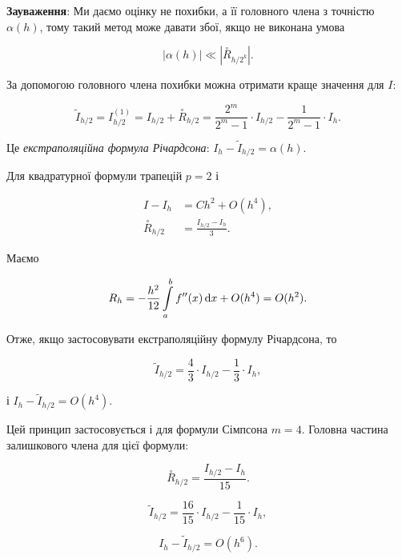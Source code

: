 \textbf{Зауваження}: Ми даємо оцінку не похибки, а її головного члена з точністю $\alpha(h)$, тому такий метод може давати збої, якщо не виконана умова

\begin{equation}
	|\alpha(h)| \ll \left| \overset{\circ} R_{h/2^k} \right|.
\end{equation}

За допомогою головного члена похибки можна отримати краще значення для $I$:

\begin{equation}
	\label{eq:9.5.3}
	\tilde I_{h/2} = I_{h/2}^{(1)} = I_{h/2} + \overset{\circ} R_{h/2} = \frac{2^m}{2^m - 1} \cdot I_{h/2} - \frac{1}{2^m - 1} \cdot I_h.
\end{equation}

Це \textit{екстраполяційна формула Річардсона}: $I_h - \tilde I_{h/2} = \alpha(h)$. \medskip

Для квадратурної формули трапецій $p = 2$ і 

\begin{align}
	I - I_h &= C h^2 + O(h^4), \\
	\overset{\circ} R_{h/2} &= \frac{I_{h/2} - I_h}{3}.
\end{align}

Маємо

\begin{equation}
	R_h = - \frac{h^2}{12} \displaystyle\int\limits_a^b f''(x) \mathop{}\!\mathrm{d} x + O(h^4) = O(h^2).
\end{equation}

Отже, якщо застосовувати екстраполяційну формулу Річардсона, то

\begin{equation}
	\label{eq:9.5.4}
	\tilde I_{h/2} = \frac{4}{3} \cdot I_{h/2} - \frac{1}{3} \cdot I_h,
\end{equation}

і $I_h - \tilde I_{h/2} = O(h^4)$. \medskip

Цей принцип застосовується і для формули Сімпсона $m = 4$. Головна частина залишкового члена для цієї формули:

\begin{equation}
	\overset{\circ} R_{h/2} = \frac{I_{h/2} - I_h}{15}.
\end{equation}

\begin{equation}
	\tilde I_{h/2} = \frac{16}{15} \cdot I_{h/2} - \frac{1}{15} \cdot I_h,
\end{equation}

\begin{equation}
	I_h - \tilde I_{h/2} = O(h^6).
\end{equation}

